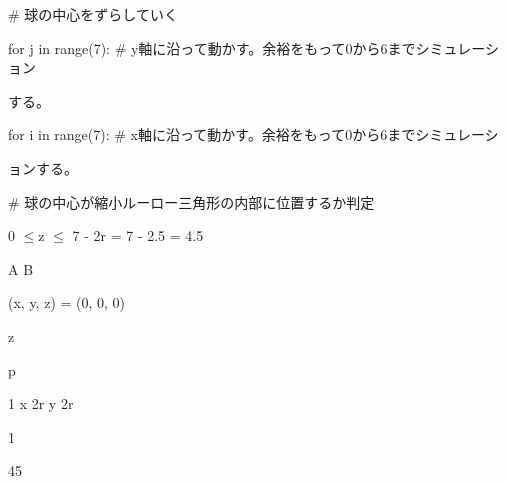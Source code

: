 \# 球の中心をずらしていく\par
for j in range(7): \# y軸に沿って動かす。余裕をもって0から6までシミュレーション\par
する。\par
for i in range(7): \# x軸に沿って動かす。余裕をもって0から6までシミュレーシ\par
ョンする。\par
\# 球の中心が縮小ルーロー三角形の内部に位置するか判定\par
0 $\leq$z $\leq$ 7 - 2r = 7 - 2.5 = 4.5\par
A B\par
(x, y, z) = (0, 0, 0)\par
z\par
p\par
1 x 2r y 2r\par
1\par
45\par

